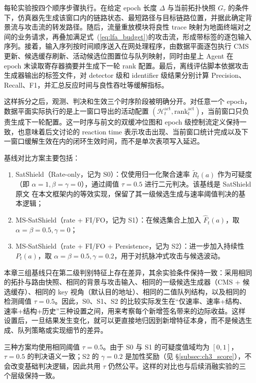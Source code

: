 每轮实验按四个顺序步骤执行。在给定 epoch 长度 $\Delta$ 与当前拓扑快照 $G_\tau$ 的条件下，仿真器先生成该窗口内的链路状态、最短路径与目标链路位置，并据此确定背景流与攻击流的转发路径。随后，流量重放模块将良性 trace 映射为地面终端对之间的业务请求，再叠加满足式~(\ref{eq:lfa_budget})的攻击流，形成带标签的逐包输入序列。接着，输入序列按时间顺序送入在网处理程序，由数据平面逐包执行 CMS 更新、候选缓存刷新、活动候选位图置位与队列映射，同时由星上 Agent 在 epoch 末读取寄存器摘要并生成下一轮 rank 配置。最后，离线评估脚本依据攻击生成器输出的标签文件，对 detector 级和 identifier 级结果分别计算 Precision、Recall、F1，并汇总反应时间与良性吞吐等缓解指标。

这样拆分之后，观测、判决和生效三个时序阶段被明确分开。对任意一个 epoch，数据平面实际执行的是上一窗口导出的活动配置 $(\mathcal{H}_t^{\mathrm{act}},\text{rank}_t^{\mathrm{act}})$，当前窗口只负责生成下一轮配置。这一时序与前文的双缓冲位图和 epoch 级控制流定义保持一致，也意味着后文讨论的 reaction time 表示攻击出现、当前窗口统计完成以及下一窗口缓解生效在内的闭环生效时间，而不是单次表项写入延迟。

基线对比方案主要包括：
\begin{enumerate}
\item SatShield（Rate-only，记为 S0）：仅使用归一化聚合速率 $\widetilde{R}_t(a)$ 作为可疑度（即 $\alpha=1,\beta=\gamma=0$），通过阈值 $\tau=0.5$ 进行二元判决。该基线是 SatShield 原文 在本文框架内的等效实现，保留了其一级候选生成与速率阈值判决的基本逻辑；
\item MS-SatShield（rate + FI/FO，记为 S1）：在候选集合上加入 $\widehat{F}_t(a)$，取 $\alpha=\beta=0.5,\gamma=0$；
\item MS-SatShield（rate + FI/FO + Persistence，记为 S2）：进一步加入持续性 $P_t(a)$，取 $\alpha=\beta=0.5,\gamma=0.2$，用于对抗脉冲式攻击与候选波动。
\end{enumerate}

本章三组基线只在第二级判别特征上存在差异，其余实验条件保持一致：采用相同的拓扑与路由快照、相同的背景与攻击输入、相同的一级候选生成器（CMS + 候选缓存）、相同的 key 视角（默认目的地址）、相同的二值队列结构，以及相同的检测阈值 $\tau=0.5$。因此，S0、S1、S2 的比较实际发生在“仅速率、速率+结构、速率+结构+历史”三种设置之间，用来考察每个新增签名带来的边际收益。这样设置后，一旦结果发生变化，就可以更直接地归因到新增特征本身，而不是候选生成、队列策略或实现细节的差异。

三种方案均使用相同阈值 $\tau=0.5$。由于 S0 与 S1 的可疑度值域均为 $[0,1]$，$\tau=0.5$ 的判决语义一致；S2 的 $\gamma=0.2$ 是加性奖励（见 \S\ref{subsec:ch3_score}），不会改变基础判决逻辑，因此共用 $\tau$ 仍然公平。这样的对比也与后续消融实验的三个层级保持一致。

